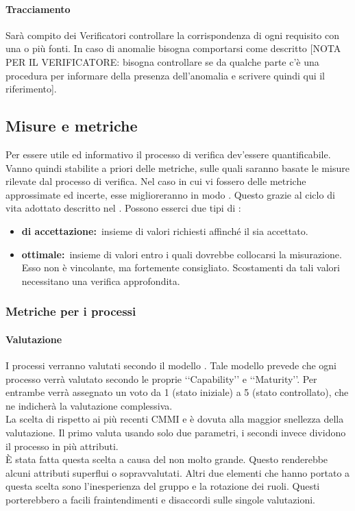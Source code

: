 			\paragraph{Tracciamento}
				Sarà compito dei Verificatori controllare la corrispondenza di ogni requisito con una o più fonti. In caso di anomalie bisogna comportarsi come descritto [NOTA PER IL VERIFICATORE: bisogna controllare se da qualche parte c'è una procedura per informare della presenza dell'anomalia e scrivere quindi qui il riferimento].
	\subsection{Misure e metriche}
		\label{sec:3.7}
		Per essere utile ed informativo il processo di verifica dev'essere quantificabile. Vanno quindi stabilite a priori delle metriche, sulle quali saranno basate le misure rilevate dal processo di verifica. Nel caso in cui vi fossero delle metriche approssimate ed incerte, esse miglioreranno in modo . Questo grazie al ciclo di vita adottato descritto nel \PPdoc. Possono esserci due tipi di :
		\begin{itemize}
			\item \textbf{ di accettazione:}\ insieme di valori richiesti affinché il  sia accettato.
			\item \textbf{ ottimale:}\ insieme di valori entro i quali dovrebbe collocarsi la misurazione. Esso non è vincolante, ma fortemente consigliato. Scostamenti da tali valori necessitano una verifica approfondita.
		\end{itemize}
		\subsubsection{Metriche per i processi}
			\label{sec:3.7.1}
			\paragraph{Valutazione }
				\label{sec:3.9.1.1}
				I processi verranno valutati secondo il modello . Tale modello prevede che ogni processo verrà valutato secondo le proprie ‘‘Capability’’ e ‘‘Maturity’’. Per entrambe verrà assegnato un voto da 1 (stato iniziale) a 5 (stato controllato), che ne indicherà la valutazione complessiva. \\
				La scelta di  rispetto ai più recenti CMMI e  è dovuta alla maggior snellezza della valutazione. Il primo valuta usando solo due parametri, i secondi invece dividono il processo in più attributi. \\
				È stata fatta questa scelta a causa del  non molto grande. Questo renderebbe alcuni attributi superflui o sopravvalutati. Altri due elementi che hanno portato a questa scelta sono l'inesperienza del gruppo e la rotazione dei ruoli. Questi porterebbero a facili fraintendimenti e disaccordi sulle singole valutazioni.
				
